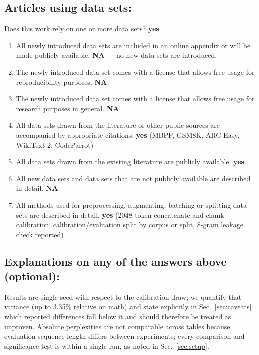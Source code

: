 \documentclass[manuscript, screen, review]{jair}
\begin{document}
\subsection*{Articles using data sets:}
Does this work rely on one or more data sets? \textbf{yes}
\begin{enumerate}
    \item All newly introduced data sets are included in an online appendix or
      will be made publicly available. \textbf{NA} --- no new data sets are
      introduced.
    \item The newly introduced data set comes with a license that allows free
      usage for reproducibility purposes. \textbf{NA}
    \item The newly introduced data set comes with a license that allows free
      usage for research purposes in general. \textbf{NA}
    \item All data sets drawn from the literature or other public sources are
      accompanied by appropriate citations. \textbf{yes} (MBPP, GSM8K,
      ARC-Easy, WikiText-2, CodeParrot)
    \item All data sets drawn from the existing literature are publicly
      available. \textbf{yes}
    \item All new data sets and data sets that are not publicly available are
      described in detail. \textbf{NA}
    \item All methods used for preprocessing, augmenting, batching or splitting
      data sets are described in detail. \textbf{yes} (2048-token
      concatenate-and-chunk calibration, calibration/evaluation split by
      corpus or split, 8-gram leakage check reported)
\end{enumerate}

\subsection*{Explanations on any of the answers above (optional):}

Results are single-seed with respect to the calibration draw; we quantify that
variance (up to 3.35\% relative on math) and state explicitly in
Sec.~\ref{sec:caveats} which reported differences fall below it and should
therefore be treated as unproven. Absolute perplexities are not comparable
across tables because evaluation sequence length differs between experiments;
every comparison and significance test is within a single run, as noted in
Sec.~\ref{sec:setup}.
\end{document}
